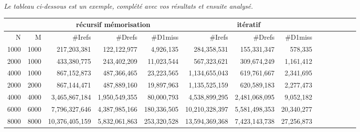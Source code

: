 \documentclass[10pt,a4paper]{article}
\begin{document}
{\em Le tableau ci-dessous est un exemple, complété avec vos résultats et ensuite analysé.}
\\
{\footnotesize
\begin{tabular}{|r|r||r|r|r||r|r|r||r|r|r||r|r|r||}
\hline
 \multicolumn{2}{|c||}{ } 
& \multicolumn{3}{c||}{récursif mémorisation}
& \multicolumn{3}{c||}{itératif}
\\ \hline
N & M 
& \#Irefs & \#Drefs & \#D1miss %
& \#Irefs & \#Drefs & \#D1miss %

\\ \hline
\hline
1000 & 1000 
& 217,203,381  & 122,122,977  & 4,926,135  %
& 284,358,531 & 155,331,347 & 578,335  %

\\ \hline
2000 & 1000 
& 433,380,775  & 243,402,209 & 11,023,544  %
& 567,323,621 & 309,674,249 & 1,161,412  %

\\ \hline
4000 & 1000 
& 867,152,873 & 487,366,465  & 23,223,565   %
& 1,134,655,043 & 619,761,667  & 2,341,695  %

\\ \hline
2000 & 2000 
& 867,144,471  & 487,889,160  & 19,897,963   %
& 1,135,525,159 & 620,589,183 & 2,277,473  %

\\ \hline
4000 & 4000 
& 3,465,867,184 & 1,950,549,355 & 80,000,793   %
& 4,538,899,295 & 2,481,068,095 & 9,052,182  %

\\ \hline
6000 & 6000 
& 7,796,327,646 & 4,387,985,166 & 180,336,505  %
& 10,210,328,397 & 5,581,498,353 & 20,340,277  %

\\ \hline
8000 & 8000 
& 10,376,405,159 & 5,832,061,863 & 253,320,528  %
& 13,594,369,368 & 7,423,143,738  & 27,256,873  %

\\ \hline
\hline
\end{tabular}
}
\end{document}
